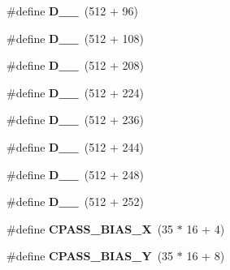 \begin{DoxyCompactItemize}
\item 
\#define {\bfseries D\+\_\+\_}~(512 + 96)\hypertarget{group___d_r_i_v_e_r_s_ga36e10f13d70b3d8e038d39d807587202}{}\label{group___d_r_i_v_e_r_s_ga36e10f13d70b3d8e038d39d807587202}

\item 
\#define {\bfseries D\+\_\+\_}~(512 + 108)\hypertarget{group___d_r_i_v_e_r_s_ga09ccdf661a9ab9f8df8f2c7070d0dff9}{}\label{group___d_r_i_v_e_r_s_ga09ccdf661a9ab9f8df8f2c7070d0dff9}

\item 
\#define {\bfseries D\+\_\+\_}~(512 + 208)\hypertarget{group___d_r_i_v_e_r_s_gae2175af550784283fee34f3e67ba9c35}{}\label{group___d_r_i_v_e_r_s_gae2175af550784283fee34f3e67ba9c35}

\item 
\#define {\bfseries D\+\_\+\_}~(512 + 224)\hypertarget{group___d_r_i_v_e_r_s_ga08f00bcef1e8814906c2354dc8b9e8b8}{}\label{group___d_r_i_v_e_r_s_ga08f00bcef1e8814906c2354dc8b9e8b8}

\item 
\#define {\bfseries D\+\_\+\_}~(512 + 236)\hypertarget{group___d_r_i_v_e_r_s_gafe0c8ed2924052fe714ec9174389bbe0}{}\label{group___d_r_i_v_e_r_s_gafe0c8ed2924052fe714ec9174389bbe0}

\item 
\#define {\bfseries D\+\_\+\_}~(512 + 244)\hypertarget{group___d_r_i_v_e_r_s_gaf53e9ad71a55861be572b74497681bb1}{}\label{group___d_r_i_v_e_r_s_gaf53e9ad71a55861be572b74497681bb1}

\item 
\#define {\bfseries D\+\_\+\_}~(512 + 248)\hypertarget{group___d_r_i_v_e_r_s_gab8953d8cd2c2dbeea3cc33ee50d0e3e1}{}\label{group___d_r_i_v_e_r_s_gab8953d8cd2c2dbeea3cc33ee50d0e3e1}

\item 
\#define {\bfseries D\+\_\+\_}~(512 + 252)\hypertarget{group___d_r_i_v_e_r_s_ga94327b4d894185063c5104a02d9714ee}{}\label{group___d_r_i_v_e_r_s_ga94327b4d894185063c5104a02d9714ee}

\item 
\#define {\bfseries C\+P\+A\+S\+S\+\_\+\+B\+I\+A\+S\+\_\+X}~(35 $\ast$ 16 + 4)\hypertarget{group___d_r_i_v_e_r_s_gaaf010f875dd67b0107be3e9fa31b3e27}{}\label{group___d_r_i_v_e_r_s_gaaf010f875dd67b0107be3e9fa31b3e27}

\item 
\#define {\bfseries C\+P\+A\+S\+S\+\_\+\+B\+I\+A\+S\+\_\+Y}~(35 $\ast$ 16 + 8)\hypertarget{group___d_r_i_v_e_r_s_ga6d24a81ab42b7fa4eb8139de1f61dabd}{}\label{group___d_r_i_v_e_r_s_ga6d24a81ab42b7fa4eb8139de1f61dabd}


\end{DoxyCompactItemize}
